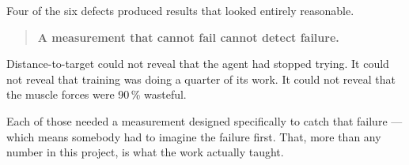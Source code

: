 \documentclass[11pt, a4paper]{article}
\begin{document}
Four of the six defects produced results that looked entirely reasonable.

\begin{quote}
\textbf{A measurement that cannot fail cannot detect failure.}
\end{quote}

Distance-to-target could not reveal that the agent had stopped trying. It could
not reveal that training was doing a quarter of its work. It could not reveal
that the muscle forces were 90\,\% wasteful.

Each of those needed a measurement designed specifically to catch that failure ---
which means somebody had to imagine the failure first. That, more than any
number in this project, is what the work actually taught.
\end{document}
